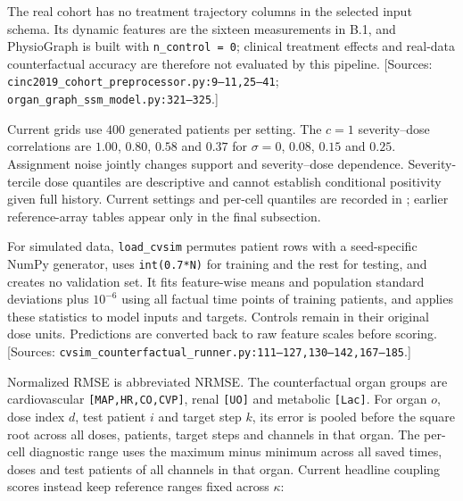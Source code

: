 The real cohort has no treatment trajectory columns in the selected input schema. Its dynamic features are the sixteen measurements in B.1, and PhysioGraph is built with \texttt{n\_\allowbreak{}control =\allowbreak{} 0}; clinical treatment effects and real-data counterfactual accuracy are therefore not evaluated by this pipeline. [Sources: \texttt{cinc2019\_\allowbreak{}cohort\_\allowbreak{}preprocessor.\allowbreak{}py:\allowbreak{}9–\allowbreak{}11,\allowbreak{}25–\allowbreak{}41}; \texttt{organ\_\allowbreak{}graph\_\allowbreak{}ssm\_\allowbreak{}model.\allowbreak{}py:\allowbreak{}321–\allowbreak{}325}.]

Current grids use $400$ generated patients per setting. The $c=1$ severity--dose correlations are $1.00$, $0.80$, $0.58$ and $0.37$ for $\sigma=0$, $0.08$, $0.15$ and $0.25$. Assignment noise jointly changes support and severity--dose dependence. Severity-tercile dose quantiles are descriptive and cannot establish conditional positivity given full history. Current settings and per-cell quantiles are recorded in ; earlier reference-array tables appear only in the final subsection.

For simulated data, \texttt{load\_\allowbreak{}cvsim} permutes patient rows with a seed-specific NumPy generator, uses \texttt{int(0.\allowbreak{}7*N)} for training and the rest for testing, and creates no validation set. It fits feature-wise means and population standard deviations plus \(10^{-6}\) using all factual time points of training patients, and applies these statistics to model inputs and targets. Controls remain in their original dose units. Predictions are converted back to raw feature scales before scoring. [Sources: \texttt{cvsim\_\allowbreak{}counterfactual\_\allowbreak{}runner.\allowbreak{}py:\allowbreak{}111–\allowbreak{}127,\allowbreak{}130–\allowbreak{}142,\allowbreak{}167–\allowbreak{}185}.]

Normalized RMSE is abbreviated NRMSE. The counterfactual organ groups are cardiovascular \texttt{[MAP,\allowbreak{}HR,\allowbreak{}CO,\allowbreak{}CVP]}, renal \texttt{[UO]} and metabolic \texttt{[Lac]}. For organ \(o\), dose index \(d\), test patient \(i\) and target step \(k\), its error is pooled before the square root across all doses, patients, target steps and channels in that organ. The per-cell diagnostic range uses the maximum minus minimum across all saved times, doses and test patients of all channels in that organ. Current headline coupling scores instead keep reference ranges fixed across $\kappa$:

